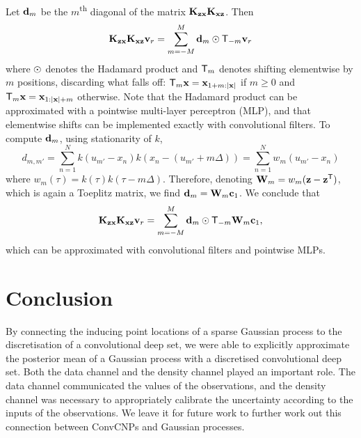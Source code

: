 \documentclass[12pt]{report}
\begin{document}
Let $\mathbf{d}_m$ be the $m$\textsuperscript{th} diagonal of the matrix $\mathbf{K}_{\mathbf{z}\mathbf{x}} \mathbf{K}_{\mathbf{x}\mathbf{z}}$.
Then
\begin{equation}
    \mK_{\vz\vx} \mK_{\vx\vz}\vv_r = \sum_{m=-M}^M \vd_m \had \T_{-m} \vv_r
\end{equation}
where $\odot$ denotes the Hadamard product and $\T_{m}$ denotes shifting elementwise by $m$ positions, discarding what falls off: $\T_{m} \vx = \vx_{1 + m:\abs{\vx}}$ if $m \ge 0$ and $\T_m \vx = \vx_{1 : \abs{\vx} + m}$ otherwise.
Note that the Hadamard product can be approximated with a pointwise multi-layer perceptron (MLP),
and that elementwise shifts can be implemented exactly with convolutional filters.
To compute $\mathbf{d}_m$, using stationarity of $k$,
\begin{equation}
    d_{m, m'}
    = \sum_{n=1}^N k(u_{m'} - x_n) k(x_n - (u_{m'} + m \Delta))
    = \sum_{n=1}^N w_m(u_{m'} - x_n)
\end{equation}
where $w_m(\tau) = k(\tau) k(\tau - m \Delta)$.
Therefore, denoting $\mW_m = w_m(\vz - \vz^\T)$, which is again a Toeplitz matrix, we find
$
    \mathbf{d}_{m} = \mathbf{W}_m \mathbf{c}_1
$.
We conclude that
\begin{equation}
    \mK_{\vz\vx} \mK_{\vx\vz}\vv_r = \sum_{m=-M}^M \vd_m \had \T_{-m} \mW_m \vc_1,
\end{equation}
which can be approximated with convolutional filters and pointwise MLPs.

\section{Conclusion}
By connecting the inducing point locations of a sparse Gaussian process to the discretisation of a convolutional deep set,
we were able to explicitly approximate the posterior mean of a Gaussian process with a discretised convolutional deep set.
Both the data channel and the density channel played an important role.
The data channel communicated the values of the observations,
and the density channel was necessary to appropriately calibrate the uncertainty according to the inputs of the observations.
We leave it for future work to further work out this connection between ConvCNPs and Gaussian processes.
\end{document}
